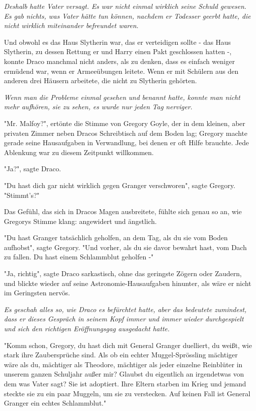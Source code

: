 {\emph{Deshalb hatte Vater versagt. Es war nicht einmal wirklich seine Schuld gewesen. Es gab nichts, was Vater hätte tun können, nachdem er Todesser geerbt hatte, die nicht wirklich miteinander befreundet waren.}

Und obwohl es das Haus Slytherin war, das er verteidigen sollte - das Haus Slytherin, zu dessen Rettung er und Harry einen Pakt geschlossen hatten -, konnte Draco manchmal nicht anders, als zu denken, dass es einfach weniger ermüdend war, wenn er Armeeübungen leitete. Wenn er mit Schülern aus den anderen drei Häusern arbeitete, die nicht zu Slytherin gehörten.

\emph{Wenn man die Probleme einmal gesehen und benannt hatte, konnte man nicht mehr aufhören, sie zu sehen, es wurde nur jeden Tag nerviger}.

"Mr. Malfoy?", ertönte die Stimme von Gregory Goyle, der in dem kleinen, aber privaten Zimmer neben Dracos Schreibtisch auf dem Boden lag; Gregory machte gerade seine Hausaufgaben in Verwandlung, bei denen er oft Hilfe brauchte. Jede Ablenkung war zu diesem Zeitpunkt willkommen.

"Ja?", sagte Draco.

"Du hast dich gar nicht wirklich gegen Granger verschworen", sagte Gregory. "Stimmt's?"

Das Gefühl, das sich in Dracos Magen ausbreitete, fühlte sich genau so an, wie Gregorys Stimme klang: angewidert und ängstlich.

"Du hast Granger tatsächlich geholfen, an dem Tag, als du sie vom Boden aufhobst", sagte Gregory. "Und vorher, als du sie davor bewahrt hast, vom Dach zu fallen. Du hast einem Schlammblut geholfen -"

"Ja, richtig", sagte Draco sarkastisch, ohne das geringste Zögern oder Zaudern, und blickte wieder auf seine Astronomie-Hausaufgaben hinunter, als wäre er nicht im Geringsten nervös.

\emph{Es geschah alles so, wie Draco es befürchtet hatte, aber das bedeutete zumindest, dass er dieses Gespräch in seinem Kopf immer und immer wieder durchgespielt und sich den richtigen Eröffnungsgag ausgedacht hatte.}

"Komm schon, Gregory, du hast dich mit General Granger duelliert, du weißt, wie stark ihre Zaubersprüche sind. Als ob ein echter Muggel-Sprössling mächtiger wäre als du, mächtiger als Theodore, mächtiger als jeder einzelne Reinblüter in unserem ganzen Schuljahr außer mir? Glaubst du eigentlich an irgendetwas von dem was Vater sagt? Sie ist adoptiert. Ihre Eltern starben im Krieg und jemand steckte sie zu ein paar Muggeln, um sie zu verstecken. Auf keinen Fall ist General Granger ein echtes Schlammblut."

}
